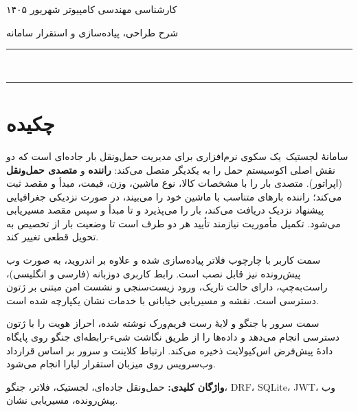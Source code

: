 \documentclass[12pt,a4paper,oneside]{report}
\newcommand{\appname}{لجستیک}
\begin{document}
\vspace{5mm}
\begin{center}
  {\normalsize کارشناسی مهندسی کامپیوتر}
  \textcolor{brandlight}{\hspace{0.35em}{\large$\cdot$}\hspace{0.35em}}
  {\normalsize شهریور ۱۴۰۵}
\end{center}

\vspace{0pt plus 1fill}
\begin{center}
\small\textcolor{muted}{شرح طراحی، پیاده‌سازی و استقرار سامانه}
\end{center}
\vspace{3mm}
\noindent\textcolor{brandlight}{\rule{\linewidth}{0.4pt}}\\[-1.6pt]
\noindent\textcolor{brand}{\rule{\linewidth}{1.15pt}}
\clearpage

\chapter*{چکیده}

سامانهٔ \appname\ یک سکوی نرم‌افزاری برای مدیریت حمل‌ونقل بار جاده‌ای است که دو نقش اصلی اکوسیستم حمل را به یکدیگر متصل می‌کند: \textbf{راننده} و \textbf{متصدی حمل‌ونقل} (اپراتور). متصدی بار را با مشخصات کالا، نوع ماشین، وزن، قیمت، مبدأ و مقصد ثبت می‌کند؛ راننده بارهای متناسب با ماشین خود را می‌بیند، در صورت نزدیکی جغرافیایی پیشنهاد نزدیک دریافت می‌کند، بار را می‌پذیرد و تا مبدأ و سپس مقصد مسیریابی می‌شود. تکمیل مأموریت نیازمند تأیید هر دو طرف است تا وضعیت بار از تخصیص به تحویل قطعی تغییر کند.

سمت کاربر با چارچوب فلاتر پیاده‌سازی شده و علاوه بر اندروید، به صورت وب پیش‌رونده نیز قابل نصب است. رابط کاربری دوزبانه (فارسی و انگلیسی)، راست‌به‌چپ، دارای حالت تاریک، ورود زیست‌سنجی و نشست امن مبتنی بر ژتون دسترسی است. نقشه و مسیریابی خیابانی با خدمات نشان یکپارچه شده است.

سمت سرور با جنگو و لایهٔ رست فریم‌ورک نوشته شده، احراز هویت را با ژتون دسترسی انجام می‌دهد و داده‌ها را از طریق نگاشت شیء-رابطه‌ای جنگو روی پایگاه دادهٔ پیش‌فرض اس‌کیو‌لایت ذخیره می‌کند. ارتباط کلاینت و سرور بر اساس قرارداد وب‌سرویس روی میزبان استقرار لیارا انجام می‌شود.

\vspace{1em}
\noindent\textbf{واژگان کلیدی:} حمل‌ونقل جاده‌ای، لجستیک، فلاتر، جنگو، \textenglish{DRF}، \textenglish{SQLite}، \textenglish{JWT}، وب پیش‌رونده، مسیریابی نشان.
\end{document}
